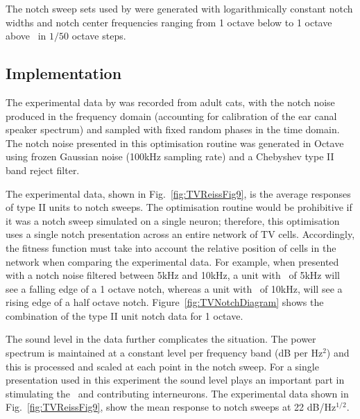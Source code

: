 
The notch sweep sets used by \citeauthor{ReissYoung:2005} were generated with logarithmically constant notch widths and notch center frequencies ranging from 1 octave below to 1 octave above \BF~in $1/50$ octave steps.

\subsection{Implementation}

The experimental data by \citet{ReissYoung:2005} was recorded from adult cats, with the notch noise produced in the frequency domain (accounting for calibration of the ear canal speaker spectrum) and sampled with fixed random phases in the time domain.
The notch noise presented in this optimisation routine was generated in Octave using frozen Gaussian noise (100kHz sampling rate) and a Chebyshev type II band reject filter.


The experimental data, shown in Fig.~\ref{fig:TVReissFig9}, is the average responses of type II units to notch sweeps.
The optimisation routine would be prohibitive if it was a notch sweep simulated on a single neuron; therefore, this optimisation uses a single notch presentation across an entire network of TV cells.
Accordingly, the fitness function must take into account the relative position of cells in the network when comparing the experimental data.
For example, when presented with a notch noise filtered between 5kHz and 10kHz, a unit with \CF~of 5kHz will see a falling edge of a 1 octave notch, whereas a unit with \CF~of 10kHz, will see a rising edge of a half octave notch.
Figure~\ref{fig:TVNotchDiagram} shows the combination of the type II unit notch data for 1 octave.

The sound level in the \citet{ReissYoung:2005} data further complicates the situation.
The power spectrum is maintained at a constant level per frequency band (dB per Hz$^2$) and this is processed and scaled at each point in the notch sweep.
For a single presentation used in this experiment the sound level plays an important part in stimulating the \ANFs~and contributing interneurons.
The experimental data shown in Fig.~\ref{fig:TVReissFig9}, show the mean response to notch sweeps at 22 dB/Hz$^{1/2}$.


